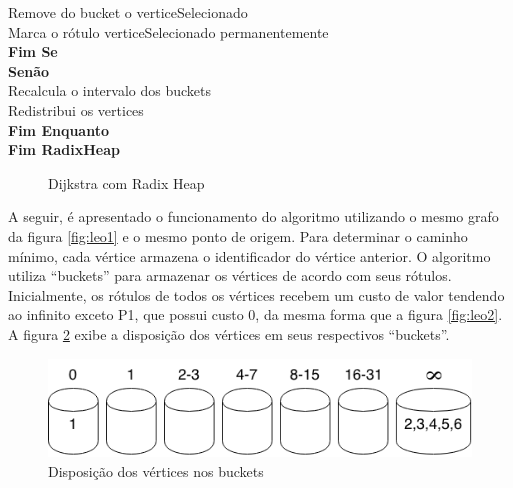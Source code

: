 {\begin{minipage}{70ex}
\vspace*{-1mm} \phantom{} \hspace{9ex} Remove do bucket o verticeSelecionado\\
\vspace*{-1mm} \phantom{} \hspace{9ex} Marca o rótulo verticeSelecionado permanentemente\\
\vspace*{-1mm} \phantom{} \hspace{6ex} {\bf Fim Se}\\
\vspace*{-1mm} \phantom{} \hspace{6ex} {\bf Senão}\\
\vspace*{-1mm} \phantom{} \hspace{9ex} Recalcula o intervalo dos buckets\\
\vspace*{-1mm} \phantom{} \hspace{9ex} Redistribui os vertices\\
\vspace*{-1mm} \phantom{} \hspace{3ex} {\bf Fim Enquanto}\\
\vspace*{-1mm} \phantom{} \hspace{0ex} {\bf Fim RadixHeap}\\
\end{minipage}}
\begin{figure}[htbp]
\centering
\caption{Dijkstra com Radix Heap}
\label{fig:radixMod}
\end{figure}

A seguir, é apresentado o funcionamento do algoritmo utilizando o mesmo grafo da figura \ref{fig:leo1}
e o mesmo ponto de origem. Para determinar o caminho mínimo, cada vértice armazena o identificador do vértice anterior.
O algoritmo utiliza ``buckets'' para armazenar os vértices de acordo com seus rótulos.
Inicialmente, os rótulos de todos os vértices recebem um custo de valor tendendo ao infinito exceto P1,
que possui custo 0, da mesma forma que a figura \ref{fig:leo2}. A figura \ref{fig:buckets} exibe a disposição dos vértices em seus
respectivos ``buckets''.

\begin{figure}[htbp]
\centering
 \includegraphics[width=.50\textwidth]{chapters/fig/buckets.png}
\caption{Disposição dos vértices nos buckets}
\label{fig:buckets}
\end{figure}
\FloatBarrier

